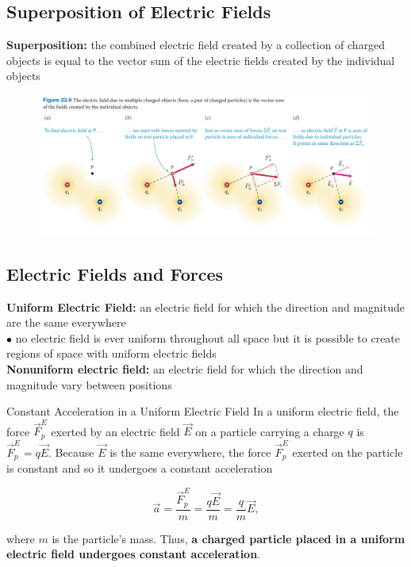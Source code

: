     \subsection{Superposition of Electric Fields}   %

        \textbf{Superposition:} the combined electric field created by a collection of charged objects is equal to the vector sum of the electric fields created by the individual objects

        \begin{figure}[hbt!]
            \centering
            \includegraphics[scale=0.75]{Resources/23.3_Superposition}
        \end{figure}

    \subsection{Electric Fields and Forces}     %

        \textbf{Uniform Electric Field:} an electric field for which the direction and magnitude are the same everywhere \\
        $\bullet$ no electric field is ever uniform throughout all space but it is possible to create regions of space with uniform electric fields \\
        \textbf{Nonuniform electric field:} an electric field for which the direction and magnitude vary between positions \\

        \begin{axiom}{Constant Acceleration in a Uniform Electric Field}
            In a uniform electric field, the force $\vec{F}^E_p$ exerted by an electric field $\vec{E}$ on a particle carrying a charge $q$ is $\vec{F}^E_p = q\vec{E}$. Because $\vec{E}$ is the same everywhere, the force
            $\vec{F}^E_p$ exerted on the particle is constant and so it undergoes a constant acceleration

            \[
                \vec{a} = \frac{\vec{F}^E_p}{m} = \frac{q\vec{E}}{m} = \frac{q}{m} \vec{E},
            \]

            where $m$ is the particle's mass. Thus, \textbf{a charged particle placed in a uniform electric field undergoes constant acceleration}.
        \end{axiom}

